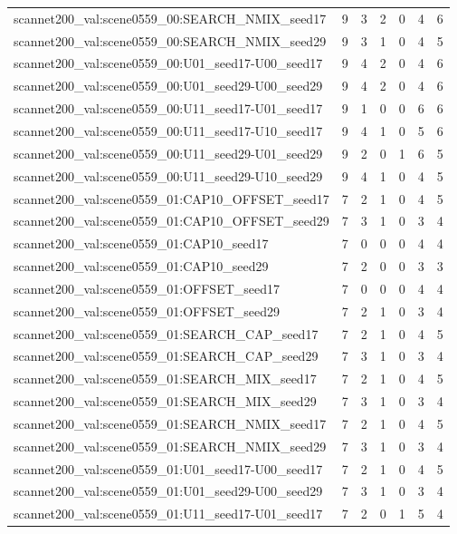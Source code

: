 \begin{table}[t]
\begin{tabular}{lrrrrrr}
scannet200\_val:scene0559\_00:SEARCH\_NMIX\_seed17 & 9 & 3 & 2 & 0 & 4 & 6 \\
scannet200\_val:scene0559\_00:SEARCH\_NMIX\_seed29 & 9 & 3 & 1 & 0 & 4 & 5 \\
scannet200\_val:scene0559\_00:U01\_seed17-U00\_seed17 & 9 & 4 & 2 & 0 & 4 & 6 \\
scannet200\_val:scene0559\_00:U01\_seed29-U00\_seed29 & 9 & 4 & 2 & 0 & 4 & 6 \\
scannet200\_val:scene0559\_00:U11\_seed17-U01\_seed17 & 9 & 1 & 0 & 0 & 6 & 6 \\
scannet200\_val:scene0559\_00:U11\_seed17-U10\_seed17 & 9 & 4 & 1 & 0 & 5 & 6 \\
scannet200\_val:scene0559\_00:U11\_seed29-U01\_seed29 & 9 & 2 & 0 & 1 & 6 & 5 \\
scannet200\_val:scene0559\_00:U11\_seed29-U10\_seed29 & 9 & 4 & 1 & 0 & 4 & 5 \\
scannet200\_val:scene0559\_01:CAP10\_OFFSET\_seed17 & 7 & 2 & 1 & 0 & 4 & 5 \\
scannet200\_val:scene0559\_01:CAP10\_OFFSET\_seed29 & 7 & 3 & 1 & 0 & 3 & 4 \\
scannet200\_val:scene0559\_01:CAP10\_seed17 & 7 & 0 & 0 & 0 & 4 & 4 \\
scannet200\_val:scene0559\_01:CAP10\_seed29 & 7 & 2 & 0 & 0 & 3 & 3 \\
scannet200\_val:scene0559\_01:OFFSET\_seed17 & 7 & 0 & 0 & 0 & 4 & 4 \\
scannet200\_val:scene0559\_01:OFFSET\_seed29 & 7 & 2 & 1 & 0 & 3 & 4 \\
scannet200\_val:scene0559\_01:SEARCH\_CAP\_seed17 & 7 & 2 & 1 & 0 & 4 & 5 \\
scannet200\_val:scene0559\_01:SEARCH\_CAP\_seed29 & 7 & 3 & 1 & 0 & 3 & 4 \\
scannet200\_val:scene0559\_01:SEARCH\_MIX\_seed17 & 7 & 2 & 1 & 0 & 4 & 5 \\
scannet200\_val:scene0559\_01:SEARCH\_MIX\_seed29 & 7 & 3 & 1 & 0 & 3 & 4 \\
scannet200\_val:scene0559\_01:SEARCH\_NMIX\_seed17 & 7 & 2 & 1 & 0 & 4 & 5 \\
scannet200\_val:scene0559\_01:SEARCH\_NMIX\_seed29 & 7 & 3 & 1 & 0 & 3 & 4 \\
scannet200\_val:scene0559\_01:U01\_seed17-U00\_seed17 & 7 & 2 & 1 & 0 & 4 & 5 \\
scannet200\_val:scene0559\_01:U01\_seed29-U00\_seed29 & 7 & 3 & 1 & 0 & 3 & 4 \\
scannet200\_val:scene0559\_01:U11\_seed17-U01\_seed17 & 7 & 2 & 0 & 1 & 5 & 4 \\

\end{tabular}
\end{table}
